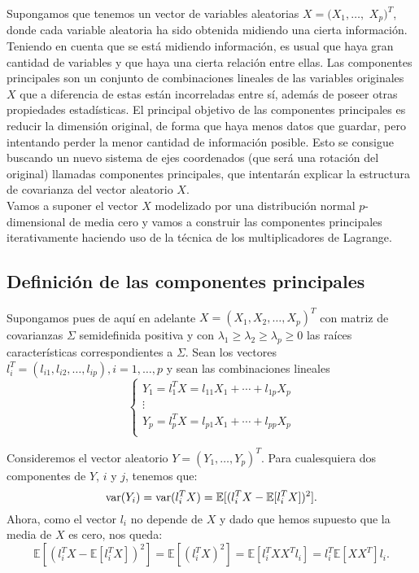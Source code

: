 Supongamos que tenemos un vector de variables aleatorias $X =  (X_1, \dots ,$ $X_p)^T$, donde cada variable aleatoria ha sido obtenida midiendo una cierta información. Teniendo en cuenta que se está midiendo información, es usual que haya gran cantidad de variables y que haya una cierta relación entre ellas. Las componentes principales son un conjunto de combinaciones lineales de las variables originales $X$ que a diferencia de estas están incorreladas entre sí, además de poseer otras propiedades estadísticas. El principal objetivo de las componentes principales es reducir la dimensión original, de forma que haya menos datos que guardar, pero intentando perder la menor cantidad de información posible. Esto se consigue buscando un nuevo sistema de ejes coordenados (que será una rotación del original) llamadas componentes principales, que intentarán explicar la estructura de covarianza del vector aleatorio $X$.\\

Vamos a suponer el vector $X$ modelizado por una distribución normal $p$-dimensional de media cero y vamos a construir las componentes principales iterativamente haciendo uso de la técnica de los multiplicadores de Lagrange.\\

\subsection{Definición de las componentes principales}

Supongamos pues de aquí en adelante $X = (X_1, X_2, \dots, X_p)^T$ con matriz de covarianzas $\Sigma$ semidefinida positiva y con $\lambda_1 \geq \lambda_2 \geq \lambda_p \geq 0$ las raíces características correspondientes a $\Sigma$. Sean los vectores $l_i^T = (l_{i1}, l_{i2}, \dots, l_{ip}), i=1,\dots,p$ y sean las combinaciones lineales 
\begin{equation*}
  \left\lbrace
  \begin{array}{l}
     Y_1 = l_1^TX = l_{11}X_1 + \cdots + l_{1p}X_p \\
     \vdots \\
     Y_p = l_p^TX = l_{p1}X_1 + \cdots + l_{pp}X_p \\
  \end{array}
  \right.
\end{equation*}

Consideremos el vector aleatorio $Y=(Y_1, \dots, Y_p)^T$. Para cualesquiera dos componentes de $Y$, $i$ y $j$, tenemos que:
\[	\text{var}{(Y_i)} = \text{var}{(l_i^TX)} = \mathbb{E}[(l_i^TX - \mathbb{E}[l_i^TX])^2]. \]
Ahora, como el vector $l_i$ no depende de $X$ y dado que hemos supuesto que la media de $X$ es cero, nos queda:
\[	\mathbb{E}[(l_i^TX - \mathbb{E}[l_i^TX])^2] = \mathbb{E}[(l_i^TX)^2] = \mathbb{E}[l_i^TXX^Tl_i] = l_i^T \mathbb{E}[XX^T] l_i. \] 

